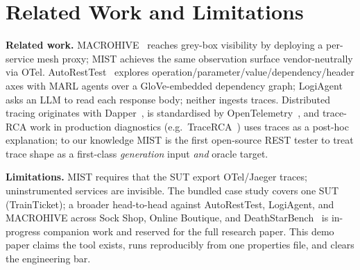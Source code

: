 \documentclass[10pt,conference]{IEEEtran}
\begin{document}
\section{Related Work and Limitations}\label{sec:rw}

\textbf{Related work.} MACROHIVE~\cite{Giamattei2022MACROHIVE,Giamattei2024MACROHIVE} reaches grey-box visibility by deploying a per-service mesh proxy; MIST achieves the same observation surface vendor-neutrally via OTel. AutoRestTest~\cite{Stennett2025AutoRestTest} explores operation/parameter/value/dependency/header axes with MARL agents over a GloVe-embedded dependency graph; LogiAgent~\cite{Zhang2025LogiAgent} asks an LLM to read each response body; neither ingests traces. Distributed tracing originates with Dapper~\cite{Sigelman2010Dapper}, is standardised by OpenTelemetry~\cite{OpenTelemetry}, and trace-RCA work in production diagnostics (e.g.\ TraceRCA~\cite{Li2021TraceRCA}) uses traces as a post-hoc explanation; to our knowledge MIST is the first open-source REST tester to treat trace shape as a first-class \emph{generation} input \emph{and} oracle target.

\textbf{Limitations.} MIST requires that the SUT export OTel/Jaeger traces; uninstrumented services are invisible. The bundled case study covers one SUT (TrainTicket); a broader head-to-head against AutoRestTest, LogiAgent, and MACROHIVE across Sock Shop, Online Boutique, and DeathStarBench~\cite{Gan2019DeathStarBench} is in-progress companion work and reserved for the full research paper. This demo paper claims the tool exists, runs reproducibly from one properties file, and clears the engineering bar.



\end{document}
